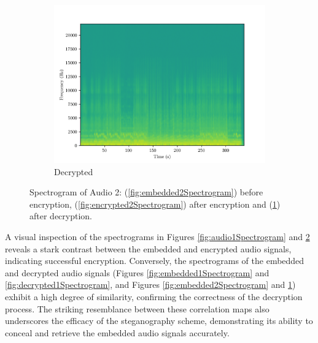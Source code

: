 \documentclass[a4paper]{cas-sc}
\begin{document}
\begin{figure}[pos=h]
\begin{subfigure}[h]{0.3\textwidth}
\begin{center}
        \end{center}
    \end{subfigure}
    \begin{subfigure}[h]{0.3\textwidth}
        \begin{center}
            \includegraphics[width=\textwidth]{decrypted2Spectrogram.png}
            \caption{Decrypted}
            \label{fig:decrypted2Spectrogram}
        \end{center}
    \end{subfigure}
    \caption{Spectrogram of Audio 2: (\ref{fig:embedded2Spectrogram}) before encryption, (\ref{fig:encrypted2Spectrogram}) after encryption and (\ref{fig:decrypted2Spectrogram}) after decryption.}
    \label{fig:audio2Spectrogram}
\end{figure}

A visual inspection of the spectrograms in Figures \ref{fig:audio1Spectrogram} and \ref{fig:audio2Spectrogram} reveals a stark contrast between the embedded and encrypted audio signals, indicating successful encryption. Conversely, the spectrograms of the embedded and decrypted audio signals (Figures \ref{fig:embedded1Spectrogram} and \ref{fig:decrypted1Spectrogram}, and Figures \ref{fig:embedded2Spectrogram} and \ref{fig:decrypted2Spectrogram}) exhibit a high degree of similarity, confirming the correctness of the decryption process. The striking resemblance between these correlation maps also underscores the efficacy of the steganography scheme, demonstrating its ability to conceal and retrieve the embedded audio signals accurately.
\end{document}
